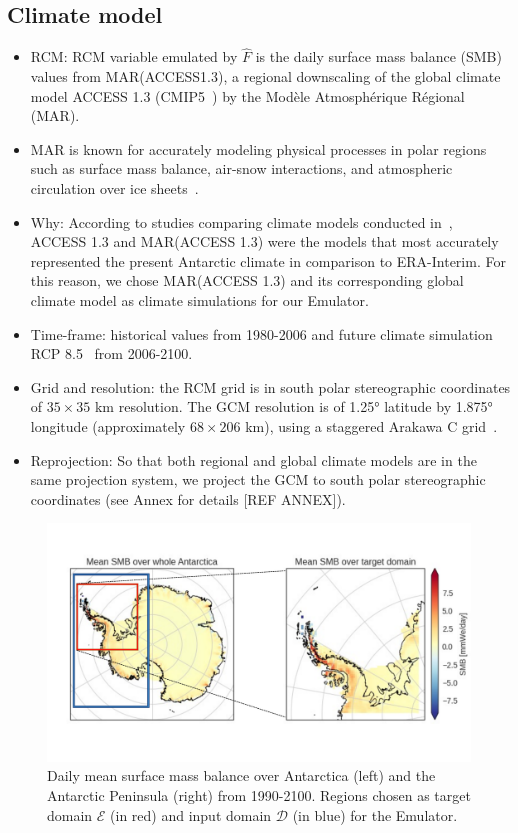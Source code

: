 \documentclass[a4paper,11pt,oneside]{report}
\begin{document}
\subsection{Climate model}
\begin{itemize}
   \item RCM: RCM variable emulated by $\hat{F}$ is the daily surface mass balance (SMB) values from MAR(ACCESS1.3), a regional downscaling of the global climate model ACCESS 1.3 (CMIP5~\cite{ACCESS13, CMIP5}) by the Modèle Atmosphérique Régional (MAR). 
    \item MAR is known for accurately modeling physical processes in polar regions such as surface mass balance, air-snow interactions, and atmospheric circulation over ice sheets~\cite{MAR}. 
    \item Why: According to studies comparing climate models conducted in~\cite{Kittel, Agosta2015}, ACCESS 1.3 and MAR(ACCESS 1.3) were the models that most accurately represented the present Antarctic climate in comparison to ERA-Interim. For this reason, we chose MAR(ACCESS 1.3) and its corresponding global climate model as climate simulations for our Emulator.  
    \item Time-frame: historical values from 1980-2006 and future climate simulation RCP 8.5~\cite{Moss2010} from 2006-2100. 
    \item Grid and resolution: the RCM grid is in south polar stereographic coordinates of $35 \times 35$ \si{km} resolution. The GCM resolution is of 1.25° latitude by 1.875° longitude (approximately $68 \times 206$ \si{km}), using a staggered Arakawa C grid~\cite{ACCESS13, ACCESS13_2}. 
    \item Reprojection: So that both regional and global climate models are in the same projection system, we project the GCM to south polar stereographic coordinates (see Annex for details [REF ANNEX]). 
\end{itemize}

\begin{figure}[!t]
  \centering
  \includegraphics[width=\columnwidth]{images/domains.pdf}
  \caption []{\small Daily mean surface mass balance over Antarctica (left) and the Antarctic Peninsula (right) from 1990-2100. Regions chosen as target domain $\mathcal{E}$ (in red) and input domain $\mathcal{D}$ (in blue) for the Emulator.}
  \vspace{-3mm}
    \label{fig:region-of-choice}
\end{figure}
\end{document}
